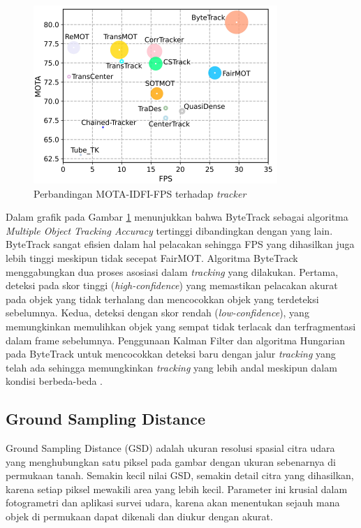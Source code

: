 \begin{figure} [H] \centering
  \includegraphics[scale=1.2]{bab2/mota_bytetrack.png}
  \caption{Perbandingan MOTA-IDFI-FPS terhadap \emph{tracker}}
  \label{fig:mota-tracker}
\end{figure}

Dalam grafik pada Gambar \ref{fig:mota-tracker} menunjukkan bahwa ByteTrack sebagai algoritma \emph{Multiple Object Tracking Accuracy} tertinggi dibandingkan dengan yang lain. ByteTrack sangat efisien dalam hal pelacakan sehingga FPS yang dihasilkan juga lebih tinggi meskipun tidak secepat FairMOT. Algoritma ByteTrack menggabungkan dua proses asosiasi dalam \emph{tracking} yang dilakukan. Pertama, deteksi pada skor tinggi (\emph{high-confidence}) yang memastikan pelacakan akurat pada objek yang tidak terhalang dan mencocokkan objek yang terdeteksi sebelumnya. Kedua, deteksi dengan skor rendah (\emph{low-confidence}), yang memungkinkan memulihkan objek yang sempat tidak terlacak dan terfragmentasi dalam frame sebelumnya. Penggunaan Kalman Filter dan algoritma Hungarian pada ByteTrack untuk mencocokkan deteksi baru dengan jalur \emph{tracking} yang telah ada sehingga memungkinkan \emph{tracking} yang lebih andal meskipun dalam kondisi berbeda-beda \cite{Zhang2022ByteTrack}.

\subsection{Ground Sampling Distance}
Ground Sampling Distance (GSD) adalah ukuran resolusi spasial citra udara yang menghubungkan satu piksel pada gambar dengan ukuran sebenarnya di permukaan tanah. Semakin kecil nilai GSD, semakin detail citra yang dihasilkan, karena setiap piksel mewakili area yang lebih kecil. Parameter ini krusial dalam fotogrametri dan aplikasi survei udara, karena akan menentukan sejauh mana objek di permukaan dapat dikenali dan diukur dengan akurat.

